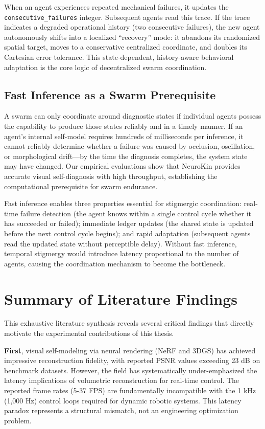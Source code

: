 \documentclass[12pt,a4paper,oneside]{report}
\begin{document}
When an agent experiences repeated mechanical failures, it updates the \texttt{consecutive\_failures} integer. Subsequent agents read this trace. If the trace indicates a degraded operational history (two consecutive failures), the new agent autonomously shifts into a localized ``recovery'' mode: it abandons its randomized spatial target, moves to a conservative centralized coordinate, and doubles its Cartesian error tolerance. This state-dependent, history-aware behavioral adaptation is the core logic of decentralized swarm coordination.

\subsection{Fast Inference as a Swarm Prerequisite}
\label{subsec:fast_inference_as_a_swarm_prerequisite}

A swarm can only coordinate around diagnostic states if individual agents possess the capability to produce those states reliably and in a timely manner. If an agent's internal self-model requires hundreds of milliseconds per inference, it cannot reliably determine whether a failure was caused by occlusion, oscillation, or morphological drift—by the time the diagnosis completes, the system state may have changed. Our empirical evaluations show that NeuroKin provides accurate visual self-diagnosis with high throughput, establishing the computational prerequisite for swarm endurance.

Fast inference enables three properties essential for stigmergic coordination: real-time failure detection (the agent knows within a single control cycle whether it has succeeded or failed); immediate ledger updates (the shared state is updated before the next control cycle begins); and rapid adaptation (subsequent agents read the updated state without perceptible delay). Without fast inference, temporal stigmergy would introduce latency proportional to the number of agents, causing the coordination mechanism to become the bottleneck.

\section{Summary of Literature Findings}

This exhaustive literature synthesis reveals several critical findings that directly motivate the experimental contributions of this thesis.

\textbf{First}, visual self-modeling via neural rendering (NeRF and 3DGS) has achieved impressive reconstruction fidelity, with reported PSNR values exceeding 23 dB on benchmark datasets. However, the field has systematically under-emphasized the latency implications of volumetric reconstruction for real-time control. The reported frame rates (5-37 FPS) are fundamentally incompatible with the 1 kHz (1,000 Hz) control loops required for dynamic robotic systems. This latency paradox represents a structural mismatch, not an engineering optimization problem.
\end{document}
